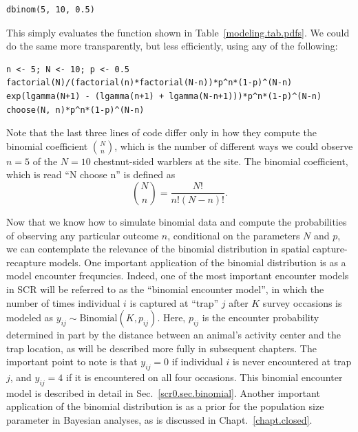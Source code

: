 \begin{verbatim}
dbinom(5, 10, 0.5)
\end{verbatim}
This simply evaluates the function shown in
Table~\ref{modeling.tab.pdfs}. We could do the same more transparently, but
less efficiently, using any of the following:
\begin{verbatim}
n <- 5; N <- 10; p <- 0.5
factorial(N)/(factorial(n)*factorial(N-n))*p^n*(1-p)^(N-n)
exp(lgamma(N+1) - (lgamma(n+1) + lgamma(N-n+1)))*p^n*(1-p)^(N-n)
choose(N, n)*p^n*(1-p)^(N-n)
\end{verbatim}
Note that the last three lines of code differ only in how they compute the
binomial coefficient $\binom{N}{n}$, which is the number of different ways
we could observe $n=5$ of the $N=10$ chestnut-sided warblers at the site. The
binomial coefficient, which is read ``N choose n'' is defined as
\begin{equation}
  \label{eq:1}
  \binom{N}{n} = \frac{N!}{n!(N-n)!}.
\end{equation}

Now that we know how to simulate binomial data and compute the
probabilities of observing any particular outcome $n$, conditional on the
parameters $N$ and $p$, we can contemplate the relevance of the
binomial distribution in spatial capture-recapture models. One
important application of the binomial distribution is as a model encounter
frequncies. Indeed, one of the most important encounter models in SCR
will be referred to as the ``binomial encounter model'', in which
the number of times individual $i$ is captured at ``trap'' $j$ after
$K$ survey occasions is
modeled as $y_{ij} \sim \text{Binomial}(K, p_{ij})$. Here, $p_{ij}$ is the
encounter probability determined in part by the distance between an
animal's activity center and the trap location, as will be described
more fully in subsequent chapters. The important point to note is
that $y_{ij}=0$ if individual $i$ is never encountered at trap $j$,
and $y_{ij}=4$ if it is encountered on all four occasions. This
binomial encounter model is
described in detail in Sec.~\ref{scr0.sec.binomial}.
Another important application of the binomial distribution is as a
prior for the population size parameter in Bayesian analyses, as is
discussed in Chapt.~\ref{chapt.closed}.




